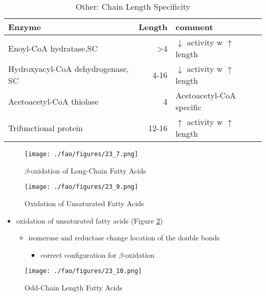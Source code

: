 \documentclass{scrartcl}
\begin{document}
\begin{table}[htbp]
\caption{\label{tab:org15e8b9a}
Other: Chain Length Specificity}
\centering
\begin{tabular}{lrl}
Enzyme & Length & comment\\
\hline
Enoyl-CoA hydratase,SC & >4 & \(\downarrow\) activity w \(\uparrow\) length\\
Hydroxyacyl-CoA dehydrogenase, SC & 4-16 & \(\downarrow\) activity w \(\uparrow\) length\\
Acetoacetyl-CoA thiolase & 4 & Acetoacetyl-CoA specific\\
Trifunctional protein & 12-16 & \(\uparrow\) activity w \(\uparrow\) length\\
\end{tabular}
\end{table}


\begin{figure}[htbp]
\centering
\texttt{[image: ./fao/figures/23\_7.png]}
\caption{\label{fig:orgabfe4b4}
\(\beta\)-oxidation of Long-Chain Fatty Acids}
\end{figure}


\begin{figure}[htbp]
\centering
\texttt{[image: ./fao/figures/23\_9.png]}
\caption{\label{fig:orgec57d1a}
Oxidation of Unsaturated Fatty Acids}
\end{figure}

\begin{itemize}
\item oxidation of unsaturated fatty acids (Figure \ref{fig:orgec57d1a})
\begin{itemize}
\item isomerase and reductase change location of the double bonds
\begin{itemize}
\item correct configuration for \(\beta\)-oxidation
\end{itemize}
\end{itemize}
\end{itemize}
\begin{figure}[htbp]
\centering
\texttt{[image: ./fao/figures/23\_10.png]}
\caption{\label{fig:orgdd3c545}
Odd-Chain Length Fatty Acids}
\end{figure}
\end{document}
